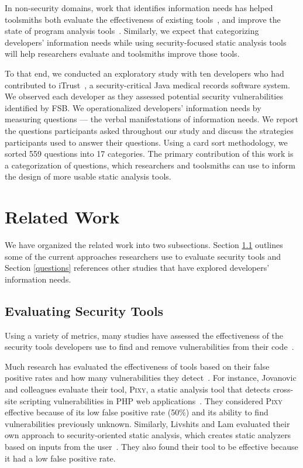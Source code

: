 \documentclass{sig-alternate}
\begin{document}
In non-security domains, work that identifies information needs has helped toolsmiths both evaluate the effectiveness of existing tools~\cite{ammar2012empirical}, and improve the state of program analysis tools~\cite{kononenko2012automatically, servant2012history, yoon2013visualization}. 
Similarly, we expect that categorizing developers' information needs while using security-focused static analysis tools will help researchers evaluate and toolsmiths improve those tools. 

To that end, we conducted an exploratory study with ten developers who had contributed to iTrust~\cite{iTrust}, a security-critical Java medical records software system.
We observed each developer as they assessed potential security vulnerabilities identified by FSB. 
We operationalized developers' information needs by measuring questions --- the verbal manifestations of information needs. 
We report the questions participants asked throughout our study and discuss the strategies participants used to answer their questions.
Using a card sort methodology, we sorted 559 questions into 17 categories. 
The primary contribution of this work is a categorization of questions, which researchers and toolsmiths can use to inform the design of more usable static analysis tools.


\section{Related Work}
\label{sec:rw}

We have organized the related work into two subsections. 
Section \ref{evaluation} outlines some of the current approaches researchers use to evaluate security tools and Section \ref{questions} references other studies that have explored developers' information needs.

\subsection{Evaluating Security Tools}
\label{evaluation}
Using a variety of metrics, many studies have assessed the effectiveness of the security tools developers use to find and remove vulnerabilities from their code~\cite{martin2005finding, austin2011one, livshits2005finding}.  

Much research has evaluated the effectiveness of tools based on their false positive rates and how many vulnerabilities they detect~\cite{jovanovic2006pixy, austin2011one, dukes2013case}. 
For instance, Jovanovic and colleagues evaluate their tool, \textsc{Pixy}, a static analysis tool that detects cross-site scripting vulnerabilities in PHP web applications~\cite{jovanovic2006pixy}. 
They considered \textsc{Pixy} effective because of its low false positive rate (50\%) and its ability to find vulnerabilities previously unknown. 
Similarly, Livshits and Lam evaluated their own approach to security-oriented static analysis, which creates static analyzers based on inputs from the user~\cite{livshits2005finding}. 
They also found their tool to be effective because it had a low false positive rate. 
\end{document}
